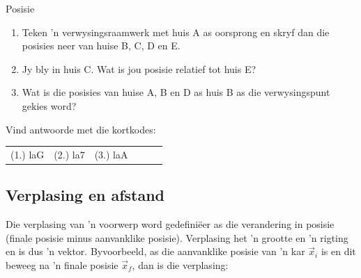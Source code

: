 \begin{exercises}{Posisie}
\begin{enumerate}[noitemsep, label=\textbf{\arabic*}. ]
\begin{enumerate}[noitemsep, label=\textbf{\alph*}. ] 
    \item Teken 'n verwysingsraamwerk met huis A as oorsprong en skryf dan die posisies neer van huise B, C, D en E.
    \item Jy bly in huis C. Wat is jou posisie relatief tot huis E?
    \item Wat is die posisies van huise A, B en D as huis B as die verwysingspunt gekies word?
\end{enumerate}
\end{enumerate}

\par {} Vind antwoorde met die kortkodes: 
 \par \begin{tabular}[h]{cccccc}
 (1.) laG  &  (2.) la7  &  (3.) laA  & \end{tabular}
\end{exercises}

\subsection*{Verplasing en afstand}
    \nopagebreak
{}

Die verplasing van 'n voorwerp word gedefini\"eer as die verandering in posisie (finale posisie minus aanvanklike posisie). Verplasing het 'n grootte en 'n rigting en is dus 'n vektor. Byvoorbeeld, as die aanvanklike posisie van 'n kar $\vec{x}_{i}$ is en dit beweeg na 'n finale posisie $\vec{x}_{f}$, dan is die verplasing:

